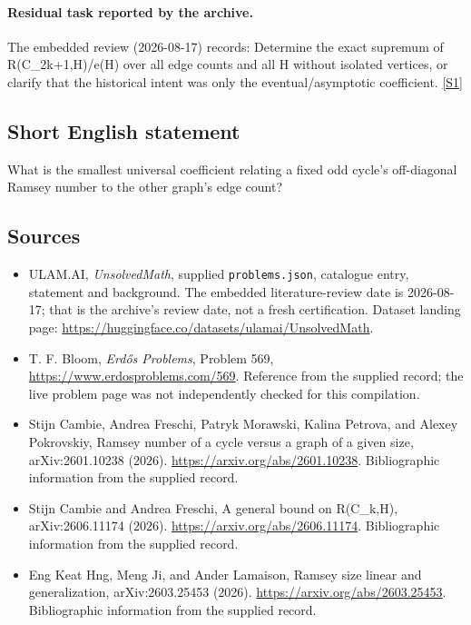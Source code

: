 \documentclass[11pt,a4paper]{article}
\newcommand{\sref}[2]{\hyperlink{source:#1:#2}{[S#2]}}
\begin{document}
\paragraph{Residual task reported by the archive.}

The embedded review (2026-08-17) records: Determine the exact supremum of R(C\_{2k+1},H)/e(H) over all edge counts and all H without isolated vertices, or clarify that the historical intent was only the eventual/asymptotic coefficient. \sref{statement}{1}

\subsection{Short English statement}

What is the smallest universal coefficient relating a fixed odd cycle's off-diagonal Ramsey number to the other graph's edge count?

\subsection{Sources}

{\small

\begin{itemize}

\item[\hypertarget{source:statement:1}{S1}] ULAM.AI, \emph{UnsolvedMath}, supplied \texttt{problems.json}, catalogue entry, statement and background. The embedded literature-review date is 2026-08-17; that is the archive’s review date, not a fresh certification. Dataset landing page: \url{https://huggingface.co/datasets/ulamai/UnsolvedMath}.

\item[\hypertarget{source:statement:2}{S2}] T. F. Bloom, \emph{Erdős Problems}, Problem 569, \url{https://www.erdosproblems.com/569}. Reference from the supplied record; the live problem page was not independently checked for this compilation.

\item[\hypertarget{source:statement:3}{S3}] Stijn Cambie, Andrea Freschi, Patryk Morawski, Kalina Petrova, and Alexey Pokrovskiy, Ramsey number of a cycle versus a graph of a given size, arXiv:2601.10238 (2026). \url{https://arxiv.org/abs/2601.10238}. Bibliographic information from the supplied record.

\item[\hypertarget{source:statement:4}{S4}] Stijn Cambie and Andrea Freschi, A general bound on R(C\_k,H), arXiv:2606.11174 (2026). \url{https://arxiv.org/abs/2606.11174}. Bibliographic information from the supplied record.

\item[\hypertarget{source:statement:5}{S5}] Eng Keat Hng, Meng Ji, and Ander Lamaison, Ramsey size linear and generalization, arXiv:2603.25453 (2026). \url{https://arxiv.org/abs/2603.25453}. Bibliographic information from the supplied record.

\end{itemize}

}

\label{end:statement}
\end{document}
